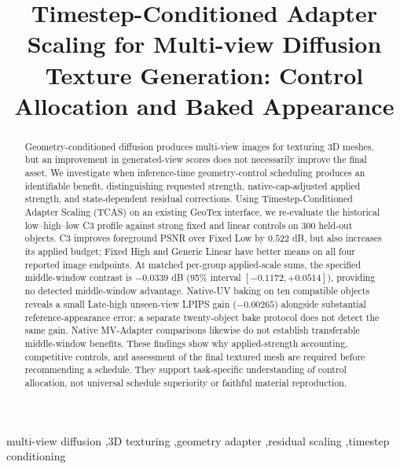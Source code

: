 \documentclass[times,twocolumn,final]{elsarticle}
\begin{document}
\begin{frontmatter}

\title{Timestep-Conditioned Adapter Scaling for Multi-view Diffusion Texture Generation: Control Allocation and Baked Appearance}


\begin{abstract}
Geometry-conditioned diffusion produces multi-view images for texturing 3D meshes, but an improvement in generated-view scores does not necessarily improve the final asset. We investigate when inference-time geometry-control scheduling produces an identifiable benefit, distinguishing requested strength, native-cap-adjusted applied strength, and state-dependent residual corrections. Using Timestep-Conditioned Adapter Scaling (TCAS) on an existing GeoTex interface, we re-evaluate the historical low--high--low C3 profile against strong fixed and linear controls on 300 held-out objects. C3 improves foreground PSNR over Fixed Low by $0.522$ dB, but also increases its applied budget; Fixed High and Generic Linear have better means on all four reported image endpoints. At matched per-group applied-scale sums, the specified middle-window contrast is $-0.0339$ dB (95\% interval $[-0.1172,+0.0514]$), providing no detected middle-window advantage. Native-UV baking on ten compatible objects reveals a small Late-high unseen-view LPIPS gain ($-0.00265$) alongside substantial reference-appearance error; a separate twenty-object bake protocol does not detect the same gain. Native MV-Adapter comparisons likewise do not establish transferable middle-window benefits. These findings show why applied-strength accounting, competitive controls, and assessment of the final textured mesh are required before recommending a schedule. They support task-specific understanding of control allocation, not universal schedule superiority or faithful material reproduction.

\end{abstract}

\begin{keyword}
\KWD
multi-view diffusion \sep 3D texturing \sep geometry adapter \sep residual scaling \sep timestep conditioning
\end{keyword}

\end{frontmatter}

\raggedbottom
\linenumbers
\end{document}
